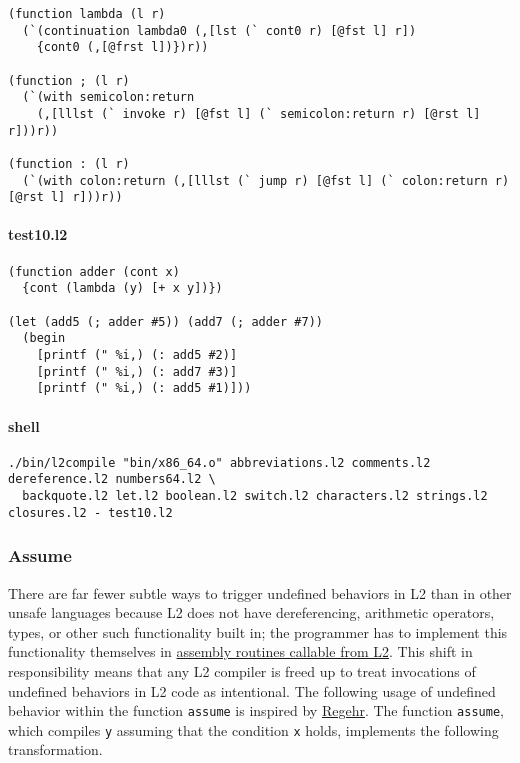 \documentclass[]{article}
\let\oldparagraph\paragraph
\renewcommand{\paragraph}[1]{\oldparagraph{#1}\mbox{}}
\begin{document}
\begin{verbatim}
(function lambda (l r)
  (`(continuation lambda0 (,[lst (` cont0 r) [@fst l] r])
    {cont0 (,[@frst l])})r))

(function ; (l r)
  (`(with semicolon:return
    (,[lllst (` invoke r) [@fst l] (` semicolon:return r) [@rst l] r]))r))

(function : (l r)
  (`(with colon:return (,[lllst (` jump r) [@fst l] (` colon:return r) [@rst l] r]))r))
\end{verbatim}

\paragraph{test10.l2}\label{test10.l2}

\begin{verbatim}
(function adder (cont x)
  {cont (lambda (y) [+ x y])})

(let (add5 (; adder #5)) (add7 (; adder #7))
  (begin
    [printf (" %i,) (: add5 #2)]
    [printf (" %i,) (: add7 #3)]
    [printf (" %i,) (: add5 #1)]))
\end{verbatim}

\paragraph{shell}\label{shell-9}

\begin{verbatim}
./bin/l2compile "bin/x86_64.o" abbreviations.l2 comments.l2 dereference.l2 numbers64.l2 \
  backquote.l2 let.l2 boolean.l2 switch.l2 characters.l2 strings.l2 closures.l2 - test10.l2
\end{verbatim}

\hypertarget{assume}{\subsubsection{Assume}\label{assume}}

There are far fewer subtle ways to trigger undefined behaviors in L2
than in other unsafe languages because L2 does not have dereferencing,
arithmetic operators, types, or other such functionality built in; the
programmer has to implement this functionality themselves in
\href{assets/x86_64.s}{assembly routines callable from L2}. This shift
in responsibility means that any L2 compiler is freed up to treat
invocations of undefined behaviors in L2 code as intentional. The
following usage of undefined behavior within the function
\texttt{assume} is inspired by
\href{https://blog.regehr.org/archives/1096}{Regehr}. The function
\texttt{assume}, which compiles \texttt{y} assuming that the condition
\texttt{x} holds, implements the following transformation.
\end{document}
